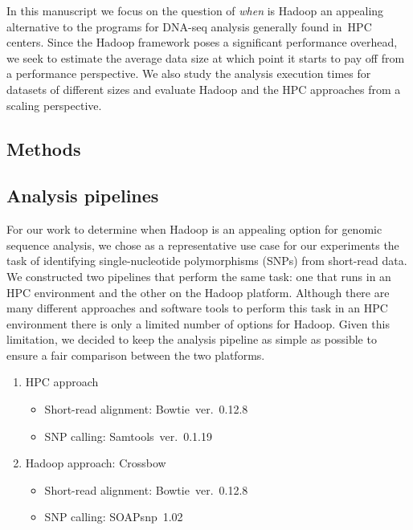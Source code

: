 \documentclass{bioinfo}
\begin{document}
In this manuscript we focus on the question of {\it when} is Hadoop an appealing alternative to the programs for DNA-seq analysis generally found in~HPC centers.
Since the Hadoop framework poses a significant performance overhead, we seek to estimate the average data size at which point it starts to pay off from a performance perspective. We also study the analysis execution times for datasets of different sizes and evaluate Hadoop and the HPC approaches from a scaling perspective.




\begin{methods}
\section{Methods}

\subsection*{Analysis pipelines}

For our work to determine when Hadoop is an appealing option for genomic
sequence analysis, we chose as a representative 
use case for our experiments the task of identifying
single-nucleotide polymorphisms (SNPs) from short-read data.  We constructed
two pipelines that perform the same task: one that runs in an HPC environment
and the other on the Hadoop platform.  Although there are many different
approaches and software tools to perform this task in an HPC environment \citep{Li:2013fk} there is only a limited
number of options for Hadoop. Given this limitation, we decided to keep the
analysis pipeline as simple as possible to ensure a fair comparison between the
two platforms.

\begin{enumerate}[(1)]
\item HPC approach
\begin{itemize}[]
\item[] Short-read alignment: Bowtie~ver.~0.12.8
\item[] SNP calling: Samtools~ver.~0.1.19
\end{itemize}
\item Hadoop approach: Crossbow
\begin{itemize}[]
\item[] Short-read alignment: Bowtie~ver.~0.12.8
\item[] SNP calling: SOAPsnp~1.02
\end{itemize}


\end{enumerate}
\end{methods}
\end{document}
